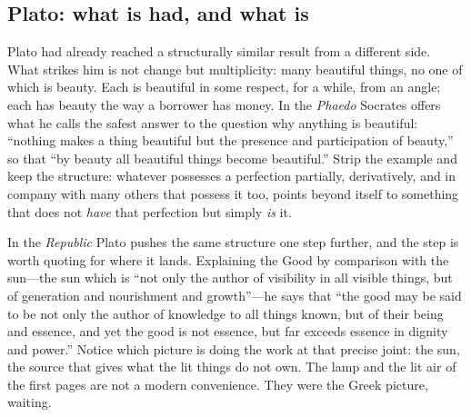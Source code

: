 \subsection{Plato: what is had, and what is}

Plato had already reached a structurally similar result from a different side. What strikes him is not change but multiplicity: many beautiful things, no one of which is beauty. Each is beautiful in some respect, for a while, from an angle; each has beauty the way a borrower has money. In the \emph{Phaedo} Socrates offers what he calls the safest answer to the question why anything is beautiful: ``nothing makes a thing beautiful but the presence and participation of beauty,'' so that ``by beauty all beautiful things become beautiful.'' Strip the example and keep the structure: whatever possesses a perfection partially, derivatively, and in company with many others that possess it too, points beyond itself to something that does not \emph{have} that perfection but simply \emph{is} it.

In the \emph{Republic} Plato pushes the same structure one step further, and the step is worth quoting for where it lands. Explaining the Good by comparison with the sun---the sun which is ``not only the author of visibility in all visible things, but of generation and nourishment and growth''---he says that ``the good may be said to be not only the author of knowledge to all things known, but of their being and essence, and yet the good is not essence, but far exceeds essence in dignity and power.'' Notice which picture is doing the work at that precise joint: the sun, the source that gives what the lit things do not own. The lamp and the lit air of the first pages are not a modern convenience. They were the Greek picture, waiting.

